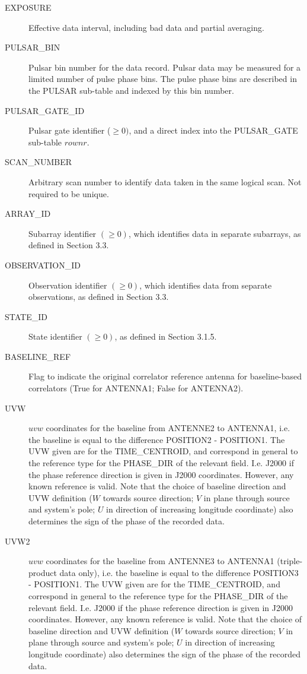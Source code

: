 \documentclass{article}
\begin{document}
\begin{description}
\item[EXPOSURE] Effective data interval, including bad data and
partial averaging.

\item[PULSAR\_BIN] Pulsar bin number for the data record. Pulsar data
may be measured for a limited number of pulse phase bins. The pulse
phase bins are described in the PULSAR sub-table and indexed by this
bin number.

\item[PULSAR\_GATE\_ID] Pulsar gate identifier ($\geq 0)$, and a direct
index into the PULSAR\_GATE sub-table $rownr$. 

\item[SCAN\_NUMBER] Arbitrary scan number to identify data taken in
the same logical scan. Not required to be unique.

\item[ARRAY\_ID] Subarray identifier $(\geq 0)$, which identifies data
in separate subarrays, as defined in Section 3.3.

\item[OBSERVATION\_ID] Observation identifier $(\geq 0)$, which identifies
data from separate observations, as defined in Section 3.3.

\item[STATE\_ID] State identifier $(\geq 0)$, as defined in Section 3.1.5.

\item[BASELINE\_REF] Flag to indicate the original correlator
reference antenna for baseline-based correlators (True for ANTENNA1;
False for ANTENNA2).

\item[UVW] $uvw$ coordinates for the baseline from ANTENNE2 to ANTENNA1,
   i.e. the
   baseline is equal to the difference POSITION2 - POSITION1. The UVW given
   are for the TIME\_CENTROID, and correspond in general to the reference type
   for the PHASE\_DIR of the relevant field. I.e. J2000 if the phase reference
   direction is given in J2000 coordinates. However, any known reference is
   valid.
   Note that the choice of baseline direction and UVW definition ($W$ towards
   source direction; $V$ in plane through source and system's pole; $U$ in
   direction of increasing longitude coordinate) also determines the sign of
   the phase of the recorded data.

\item[UVW2] $uvw$ coordinates for the baseline from ANTENNE3 to ANTENNA1
   (triple-product data only), i.e. the
   baseline is equal to the difference POSITION3 - POSITION1. The UVW given
   are for the TIME\_CENTROID, and correspond in general to the reference type
   for the PHASE\_DIR of the relevant field. I.e. J2000 if the phase reference
   direction is given in J2000 coordinates. However, any known reference is
   valid.
   Note that the choice of baseline direction and UVW definition ($W$ towards
   source direction; $V$ in plane through source and system's pole; $U$ in
   direction of increasing longitude coordinate) also determines the sign of
   the phase of the recorded data.


\end{description}
\end{document}
